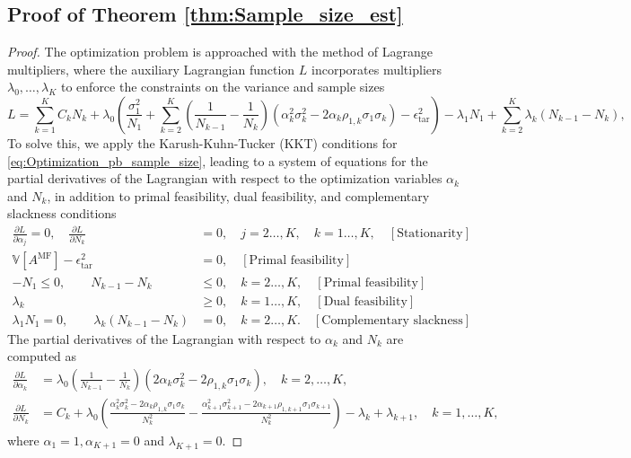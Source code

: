 \subsection{Proof of Theorem \ref{thm:Sample_size_est}}

\begin{proof}
The optimization problem is approached with the method of Lagrange multipliers, where the auxiliary Lagrangian function $L$ incorporates multipliers $\lambda_0,\ldots, \lambda_K$ to enforce the constraints on the variance and sample sizes
%
\[
L = \sum_{k=1}^K C_kN_k +\lambda_0 \left(\frac{\sigma_1^2}{N_1} + \sum_{k=2}^K \left(\frac{1}{N_{k-1}} - \frac{1}{N_k}\right)\left(\alpha_k^2\sigma_k^2 - 2\alpha_k\rho_{1,k}\sigma_1\sigma_k\right)- \epsilon_{\text{tar}}^2\right)-\lambda_1 N_1+\sum_{k=2}^K\lambda_k(N_{k-1} - N_k),
\]
%
To solve this, we apply the Karush-Kuhn-Tucker (KKT) conditions for \eqref{eq:Optimization_pb_sample_size}, leading to a system of equations for the partial derivatives of the Lagrangian with respect to the optimization variables $\alpha_k$ and $N_k$,  in addition to  primal feasibility, dual feasibility, and complementary slackness conditions
%
\begin{align*}
\frac{\partial L}{\partial \alpha_j}=0,\quad \frac{\partial L}{\partial N_k}&=0,\quad j=2\ldots,K, \quad k=1\ldots,K, \quad [\text{Stationarity}]\\
\mathbb{V}\left[A^{\text{MF}}\right]- \epsilon_{\text{tar}}^2 &= 0, \quad [\text{Primal feasibility}]\\ 
   -N_1\le 0,\qquad N_{k-1}-N_k&\le 0, \quad k=2\ldots,K,\quad [\text{Primal feasibility}]\\ 
    \lambda_k &\ge 0,\quad k=1\ldots,K, \quad [\text{Dual feasibility}]\\ 
    \lambda_1 N_1=0,\qquad\lambda_k(N_{k-1}-N_k)&=0,\quad k=2\ldots,K. \quad [\text{Complementary slackness}]
\end{align*}
%
The partial derivatives of the Lagrangian with respect to $\alpha_k$ and $N_k$ are computed as
%
\begin{align*}
    \frac{\partial L}{\partial \alpha_k}&=\lambda_0\left(\frac{1}{N_{k-1}} - \frac{1}{N_k}\right)\left(2\alpha_k\sigma_k^2 - 2\rho_{1,k}\sigma_1\sigma_k\right),\quad k=2,\dots,K,\\
    \frac{\partial L}{\partial N_k}&=C_k+\lambda_0\left(\frac{\alpha_k^2\sigma_k^2 - 2\alpha_k\rho_{1,k}\sigma_1\sigma_k}{N_k^2}-\frac{\alpha_{k+1}^2\sigma_{k+1}^2 - 2\alpha_{k+1}\rho_{1,k+1}\sigma_1\sigma_{k+1}}{N_k^2}\right)-\lambda_k+\lambda_{k+1}, \quad k=1,\dots,K,
\end{align*}
%
where $\alpha_1 = 1, \alpha_{K+1} = 0$ and $\lambda_{K+1} = 0$. 


\end{proof}
